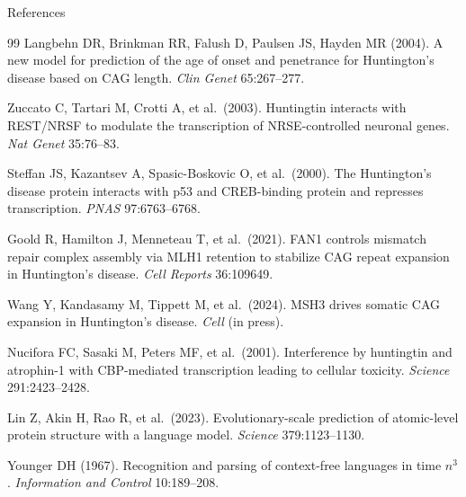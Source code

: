 \documentclass[aspectratio=169,11pt]{beamer}
\begin{document}
\begin{frame}[allowframebreaks]{References}
    \begin{thebibliography}{99}
         Langbehn DR, Brinkman RR, Falush D, Paulsen JS, Hayden MR (2004). A new model for prediction of the age of onset and penetrance for Huntington's disease based on CAG length. \textit{Clin Genet} 65:267--277.

         Zuccato C, Tartari M, Crotti A, et al.\ (2003). Huntingtin interacts with REST/NRSF to modulate the transcription of NRSE-controlled neuronal genes. \textit{Nat Genet} 35:76--83.

         Steffan JS, Kazantsev A, Spasic-Boskovic O, et al.\ (2000). The Huntington's disease protein interacts with p53 and CREB-binding protein and represses transcription. \textit{PNAS} 97:6763--6768.

         Goold R, Hamilton J, Menneteau T, et al.\ (2021). FAN1 controls mismatch repair complex assembly via MLH1 retention to stabilize CAG repeat expansion in Huntington's disease. \textit{Cell Reports} 36:109649.

         Wang Y, Kandasamy M, Tippett M, et al.\ (2024). MSH3 drives somatic CAG expansion in Huntington's disease. \textit{Cell} (in press).

         Nucifora FC, Sasaki M, Peters MF, et al.\ (2001). Interference by huntingtin and atrophin-1 with CBP-mediated transcription leading to cellular toxicity. \textit{Science} 291:2423--2428.

         Lin Z, Akin H, Rao R, et al.\ (2023). Evolutionary-scale prediction of atomic-level protein structure with a language model. \textit{Science} 379:1123--1130.

         Younger DH (1967). Recognition and parsing of context-free languages in time $n^3$. \textit{Information and Control} 10:189--208.
    \end{thebibliography}
\end{frame}
\end{document}
